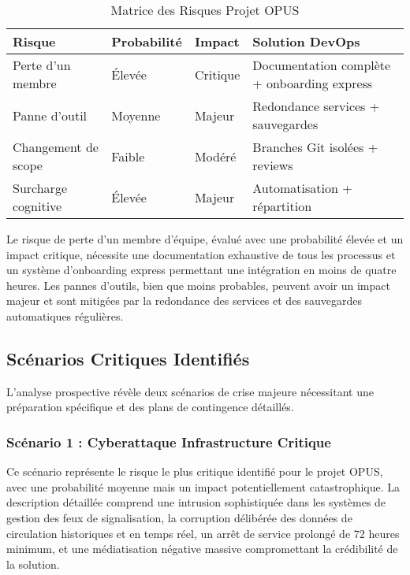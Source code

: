 \documentclass[12pt,a4paper]{article}
\begin{document}
\begin{table}[H]
\centering
\caption{Matrice des Risques Projet OPUS}
\begin{tabular}{|p{3cm}|p{2cm}|p{2cm}|p{5cm}|}
\hline
\textbf{Risque} & \textbf{Probabilité} & \textbf{Impact} & \textbf{Solution DevOps} \\
\hline
Perte d'un membre & Élevée & Critique & Documentation complète + onboarding express \\
\hline
Panne d'outil & Moyenne & Majeur & Redondance services + sauvegardes \\
\hline
Changement de scope & Faible & Modéré & Branches Git isolées + reviews \\
\hline
Surcharge cognitive & Élevée & Majeur & Automatisation + répartition \\
\hline
\end{tabular}
\end{table}

Le risque de perte d'un membre d'équipe, évalué avec une probabilité élevée et un impact critique, nécessite une documentation exhaustive de tous les processus et un système d'onboarding express permettant une intégration en moins de quatre heures. Les pannes d'outils, bien que moins probables, peuvent avoir un impact majeur et sont mitigées par la redondance des services et des sauvegardes automatiques régulières.

\subsection{Scénarios Critiques Identifiés}

L'analyse prospective révèle deux scénarios de crise majeure nécessitant une préparation spécifique et des plans de contingence détaillés.

\subsubsection{Scénario 1 : Cyberattaque Infrastructure Critique}

Ce scénario représente le risque le plus critique identifié pour le projet OPUS, avec une probabilité moyenne mais un impact potentiellement catastrophique. La description détaillée comprend une intrusion sophistiquée dans les systèmes de gestion des feux de signalisation, la corruption délibérée des données de circulation historiques et en temps réel, un arrêt de service prolongé de 72 heures minimum, et une médiatisation négative massive compromettant la crédibilité de la solution.
\end{document}
